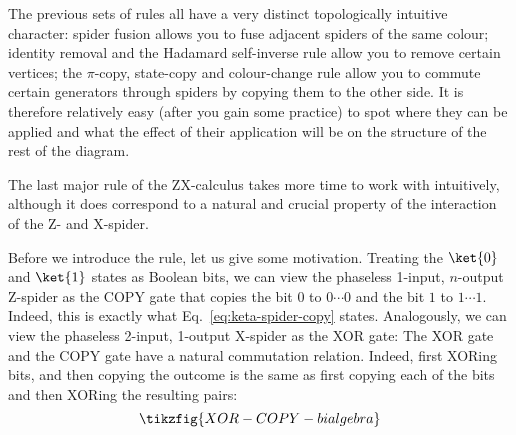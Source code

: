 \documentclass[a4paper,onecolumn,superscriptaddress,11pt,%
				unpublished,%
				allowfontchageintitle,%
				]{quantumarticle}
\begin{document}
The previous sets of rules all have a very distinct topologically intuitive character: spider fusion allows you to fuse adjacent spiders of the same colour; identity removal and the Hadamard self-inverse rule allow you to remove certain vertices; the $\pi$-copy, state-copy and colour-change rule allow you to commute certain generators through spiders by copying them to the other side.
It is therefore relatively easy (after you gain some practice) to spot where they can be applied and what the effect of their application will be on the structure of the rest of the diagram.

The last major rule of the ZX-calculus takes more time to work with intuitively, although it does correspond to a natural and crucial property of the interaction of the Z- and X-spider.

Before we introduce the rule, let us give some motivation.
Treating the $\ket{0}$ and $\ket{1}$ states as Boolean bits, we can view the phaseless 1-input, $n$-output Z-spider as the COPY gate that copies the bit $0$ to $0\cdots0$ and the bit $1$ to $1\cdots 1$. Indeed, this is exactly what Eq.~\eqref{eq:keta-spider-copy} states. Analogously, we can view the phaseless 2-input, 1-output X-spider as the XOR gate:
The XOR gate and the COPY gate have a natural commutation relation. Indeed, first XORing bits, and then copying the outcome is the same as first copying each of the bits and then XORing the resulting pairs:
\begin{equation}\label{eq:XOR-COPY-bialgebra}
\tikzfig{XOR-COPY-bialgebra}
\end{equation}
\end{document}
